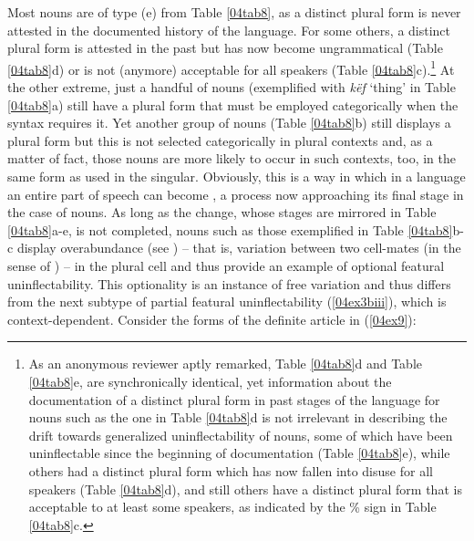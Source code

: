 \documentclass[output=paper,colorlinks,citecolor=brown]{langscibook}
\begin{document}
Most  nouns are of type (e) from Table \ref{04tab8}, as a distinct plural form is never attested in the documented history of the language. For some others, a distinct plural form is attested in the past but has now become ungrammatical (Table \ref{04tab8}d) or is not (anymore) acceptable for all speakers (Table \ref{04tab8}c).\footnote{As an anonymous reviewer aptly remarked, Table \ref{04tab8}d and Table \ref{04tab8}e, are synchronically identical, yet information about the documentation of a distinct plural form in past stages of the language for nouns such as the one in Table \ref{04tab8}d is not irrelevant in describing the drift towards generalized uninflectability of  nouns, some of which have been uninflectable since the beginning of documentation (Table \ref{04tab8}e), while others had a distinct plural form which has now fallen into disuse for all speakers (Table \ref{04tab8}d), and still others have a distinct plural form that is acceptable to at least some speakers, as indicated by the \% sign in Table \ref{04tab8}c.} At the other extreme, just a handful of nouns (exemplified with \emph{këf} `thing' in Table \ref{04tab8}a) still have a plural form that must be employed categorically when the syntax requires it. Yet another group of nouns (Table \ref{04tab8}b) still displays a plural form but this is not selected categorically in plural contexts and, as a matter of fact, those nouns are more likely to occur in such contexts, too, in the same form as used in the singular. Obviously, this is a way in which in a language an entire part of speech can become , a process now approaching its final stage in the case of  nouns. As long as the change, whose stages are mirrored in Table \ref{04tab8}a-e, is not completed, nouns such as those exemplified in Table \ref{04tab8}b-c display overabundance (see \citealt{thornton2011}) -- that is, variation between two cell-mates (in the sense of \citealt[420]{loporcaropaciaroni2011}) -- in the plural cell and thus provide an example of optional featural uninflectability. This optionality is an instance of free variation and thus differs from the next subtype of partial featural uninflectability (\ref{04ex3biii}), which is context-dependent. Consider the forms of the  definite article in (\ref{04ex9}):

\bigskip
\end{document}
